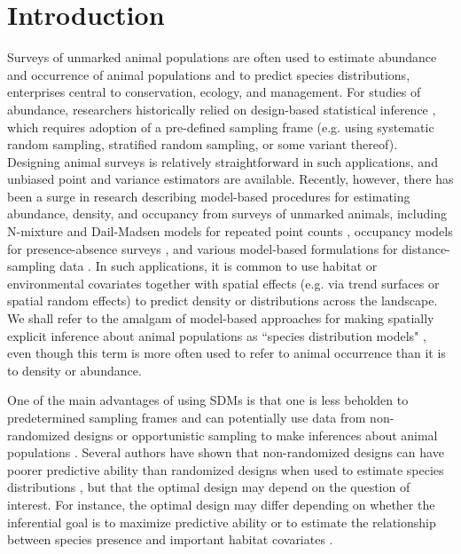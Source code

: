 \documentclass[times,mee,doublespace,]{besauth2}
\begin{document}

\maketitle \linenumbers

\def\VAR{{\rm Var}\,}
\def\COV{{\rm Cov}\,}
\def\Prob{{\rm P}\,}
\def\bfX{\bf X}
\def\bfbeta{\boldsymbol{\beta}}
\def\bfdelta{\boldsymbol{\delta}}
\def\bfeta{\boldsymbol{\eta}}
\def\bfnu{\boldsymbol{\nu}}
\def\bfmu{\boldsymbol{\mu}}


\section{Introduction}

Surveys of unmarked animal populations are often used to estimate abundance and occurrence of animal populations and to predict species distributions, enterprises central to conservation, ecology, and management. For studies of abundance, researchers historically relied on design-based statistical inference \citep[e.g.][]{Cochran1977}, which requires adoption of a pre-defined sampling frame (e.g. using systematic random sampling, stratified random sampling, or some variant thereof).  Designing animal surveys is relatively straightforward in such applications, and unbiased point and variance estimators are available.  Recently, however, there has been a surge in research describing model-based procedures for estimating abundance, density, and occupancy from surveys of unmarked animals, including N-mixture and Dail-Madsen models for repeated point counts \citep{Royle2004a,DailMadsen2011}, occupancy models for presence-absence surveys \citep{MacKenzie2002,JohnsonEtAl2013}, and various model-based formulations for distance-sampling data \citep{HedleyBuckland2004,JohnsonEtAl2010,MillerEtAl2013}.  In such applications, it is common to use habitat or environmental covariates together with spatial effects (e.g. via trend surfaces or spatial random effects) to predict density or distributions across the landscape.  We shall refer to the amalgam of model-based approaches for making spatially explicit inference about animal populations as ``species distribution models" \citep[SDMs; {\it sensu}][]{ElithLeathwick2009}, even though this term is more often used to refer to animal occurrence than it is to density or abundance.

One of the main advantages of using SDMs is that one is less beholden to predetermined sampling frames and can potentially use data from non-randomized designs or opportunistic sampling to make inferences about animal populations \citep{JohnsonEtAl2010}. Several authors have shown that non-randomized designs can have poorer predictive ability than randomized designs when used to estimate species distributions \citep[e.g.][]{EdwardsEtAl2006,AlbertEtAl2010}, but that the optimal design may depend on the question of interest.  For instance, the optimal design may differ depending on whether the inferential goal is to maximize predictive ability or to estimate the relationship between species presence and important habitat covariates \citep{AlbertEtAl2010}.
\end{document}
